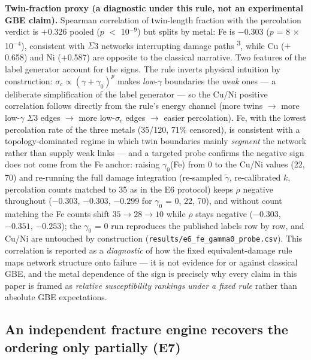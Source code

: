 \documentclass[11pt]{article}
\begin{document}
\textbf{Twin-fraction proxy (a diagnostic under this rule, not an experimental GBE claim).} Spearman correlation of twin-length fraction with the percolation verdict is $+$0.326 pooled ($p$ $<$ 10$^{-9}$) but splits by metal: Fe is $-$0.303 ($p$ = 8 $\times$ 10$^{-4}$), consistent with $\Sigma$3 networks interrupting damage paths \textsuperscript{3}, while Cu ($+$0.658) and Ni ($+$0.587) are opposite to the classical narrative. Two features of the label generator account for the signs. The rule inverts physical intuition by construction: $\sigma_{c} \propto (\gamma + \gamma_0)^{p}$ makes \textit{low}-$\gamma$ boundaries the \textit{weak} ones --- a deliberate simplification of the label generator --- so the Cu/Ni positive correlation follows directly from the rule's energy channel (more twins $\rightarrow$ more low-$\gamma$ $\Sigma$3 edges $\rightarrow$ more low-$\sigma_{c}$ edges $\rightarrow$ easier percolation). Fe, with the lowest percolation rate of the three metals (35/120, 71\% censored), is consistent with a topology-dominated regime in which twin boundaries mainly \textit{segment} the network rather than supply weak links --- and a targeted probe confirms the negative sign does not come from the Fe anchor: raising $\gamma_0$(Fe) from 0 to the Cu/Ni values (22, 70) and re-running the full damage integration (re-sampled $\tilde{\gamma}$, re-calibrated $k$, percolation counts matched to 35 as in the E6 protocol) keeps $\rho$ negative throughout ($-0.303$, $-0.303$, $-0.299$ for $\gamma_0$ = 0, 22, 70), and without count matching the Fe counts shift $35 \rightarrow 28 \rightarrow 10$ while $\rho$ stays negative ($-0.303$, $-0.351$, $-0.253$); the $\gamma_0$ = 0 run reproduces the published labels row by row, and Cu/Ni are untouched by construction (\texttt{results/e6\_fe\_gamma0\_probe.csv}). This correlation is reported as a \textit{diagnostic} of how the fixed equivalent-damage rule maps network structure onto failure --- it is not evidence for or against classical GBE, and the metal dependence of the sign is precisely why every claim in this paper is framed as \textit{relative susceptibility rankings under a fixed rule} rather than absolute GBE expectations.

\subsection{An independent fracture engine recovers the ordering only partially (E7)}
\end{document}
